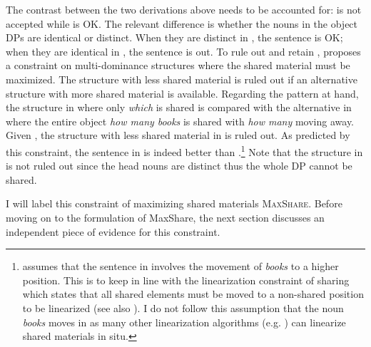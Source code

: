 \documentclass[output=paper]{langscibook}
\begin{document}
The contrast between the two derivations above needs to be accounted for:  is not accepted while  is OK. The relevant difference is whether the nouns in the object DPs are identical or distinct. When they are distinct in , the sentence is OK; when they are identical in , the sentence is out. To rule out  and retain , \citet{Citko:2006} proposes a constraint on multi-dominance structures where the shared material must be maximized. The structure with less shared material is ruled out if an alternative structure with more shared material is available. Regarding the pattern at hand, the structure in  where only \textit{which} is shared is compared with the alternative in  where the entire object \textit{how many books} is shared with \textit{how many} moving away. Given , the structure with less shared material in  is ruled out. As predicted by this constraint, the sentence in  is indeed better than .\footnote{\citet{Citko:2006} assumes that the sentence in  involves the movement of \textit{books} to a higher position. This is to keep in line with the linearization constraint of sharing which states that all shared elements must be moved to a non-shared position to be linearized (see also \citealt{Gracanin-Yuksek:2007}). I do not follow this assumption that the noun \textit{books} moves in  as many other linearization algorithms (e.g. \citealt{Wilder:2008, deVries:2009, Gracanin-Yuksek:2013}) can linearize shared materials in situ.} Note that the structure in  is not ruled out since the head nouns are distinct thus the whole DP cannot be shared. 

\z 
I will label this constraint of maximizing shared materials \textsc{MaxShare}. Before moving on to the formulation of MaxShare, the next section discusses an independent piece of evidence for this constraint.
\end{document}
